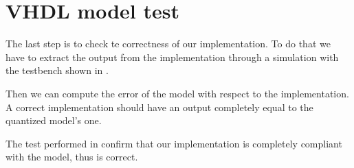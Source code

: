 \section{VHDL model test}\label{sec:vhdltest}

The last step is to check te correctness of our implementation. To do that we
have to extract the output from the implementation through a simulation with
the testbench shown in .




Then we can compute the error of the \matlab{} model with respect to the
implementation. A correct implementation should have an output completely equal
to the quantized model's one.

The test performed in  confirm that our implementation
is completely compliant with the \matlab{} model, thus is correct.


